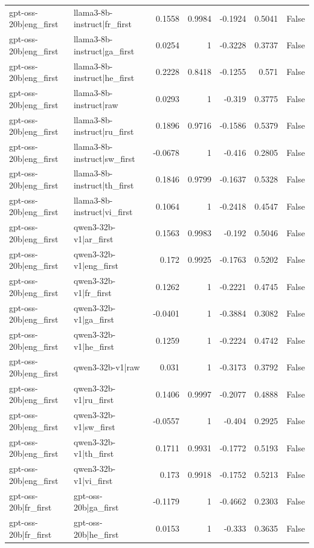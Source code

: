 \begin{table}
\begin{tabular}{l l r r r r l}
gpt-oss-20b|eng_first & llama3-8b-instruct|fr_first & 0.1558 & 0.9984 & -0.1924 & 0.5041 & False \\
gpt-oss-20b|eng_first & llama3-8b-instruct|ga_first & 0.0254 & 1 & -0.3228 & 0.3737 & False \\
gpt-oss-20b|eng_first & llama3-8b-instruct|he_first & 0.2228 & 0.8418 & -0.1255 & 0.571 & False \\
gpt-oss-20b|eng_first & llama3-8b-instruct|raw & 0.0293 & 1 & -0.319 & 0.3775 & False \\
gpt-oss-20b|eng_first & llama3-8b-instruct|ru_first & 0.1896 & 0.9716 & -0.1586 & 0.5379 & False \\
gpt-oss-20b|eng_first & llama3-8b-instruct|sw_first & -0.0678 & 1 & -0.416 & 0.2805 & False \\
gpt-oss-20b|eng_first & llama3-8b-instruct|th_first & 0.1846 & 0.9799 & -0.1637 & 0.5328 & False \\
gpt-oss-20b|eng_first & llama3-8b-instruct|vi_first & 0.1064 & 1 & -0.2418 & 0.4547 & False \\
gpt-oss-20b|eng_first & qwen3-32b-v1|ar_first & 0.1563 & 0.9983 & -0.192 & 0.5046 & False \\
gpt-oss-20b|eng_first & qwen3-32b-v1|eng_first & 0.172 & 0.9925 & -0.1763 & 0.5202 & False \\
gpt-oss-20b|eng_first & qwen3-32b-v1|fr_first & 0.1262 & 1 & -0.2221 & 0.4745 & False \\
gpt-oss-20b|eng_first & qwen3-32b-v1|ga_first & -0.0401 & 1 & -0.3884 & 0.3082 & False \\
gpt-oss-20b|eng_first & qwen3-32b-v1|he_first & 0.1259 & 1 & -0.2224 & 0.4742 & False \\
gpt-oss-20b|eng_first & qwen3-32b-v1|raw & 0.031 & 1 & -0.3173 & 0.3792 & False \\
gpt-oss-20b|eng_first & qwen3-32b-v1|ru_first & 0.1406 & 0.9997 & -0.2077 & 0.4888 & False \\
gpt-oss-20b|eng_first & qwen3-32b-v1|sw_first & -0.0557 & 1 & -0.404 & 0.2925 & False \\
gpt-oss-20b|eng_first & qwen3-32b-v1|th_first & 0.1711 & 0.9931 & -0.1772 & 0.5193 & False \\
gpt-oss-20b|eng_first & qwen3-32b-v1|vi_first & 0.173 & 0.9918 & -0.1752 & 0.5213 & False \\
gpt-oss-20b|fr_first & gpt-oss-20b|ga_first & -0.1179 & 1 & -0.4662 & 0.2303 & False \\
gpt-oss-20b|fr_first & gpt-oss-20b|he_first & 0.0153 & 1 & -0.333 & 0.3635 & False \\

\end{tabular}
\end{table}
